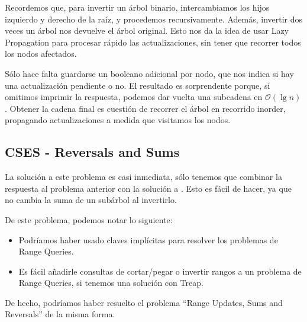 Recordemos que, para invertir un árbol binario, intercambiamos los hijos izquierdo y derecho de la raíz, y procedemos recursivamente.
Además, invertir dos veces un árbol nos devuelve el árbol original.
Esto nos da la idea de usar Lazy Propagation para procesar rápido las actualizaciones, sin tener que recorrer todos los nodos afectados.

Sólo hace falta guardarse un booleano adicional por nodo,
que nos indica si hay una actualización pendiente o no.
El resultado es sorprendente porque, si omitimos imprimir la respuesta, podemos dar vuelta una subcadena en \(\mathcal{O}(\lg n)\).
Obtener la cadena final es cuestión de recorrer el árbol en recorrido inorder, propagando actualizaciones a medida que visitamos los nodos.



\subsection{CSES - Reversals and Sums}
\label{sec:reversals-and-sums}


La solución a este problema es casi inmediata, sólo tenemos que combinar la respuesta al problema anterior con la solución a .
Esto es fácil de hacer, ya que no cambia la suma de un subárbol al invertirlo.

De este problema, podemos notar lo siguiente:
\begin{itemize}
\item Podríamos haber usado claves implícitas para resolver los problemas de Range Queries.
\item Es fácil añadirle consultas de cortar/pegar o invertir rangos a un problema de Range Queries, si tenemos una solución con Treap.
\end{itemize}

De hecho, podríamos haber resuelto el problema ``Range Updates, Sums and Reversals'' de la misma forma.